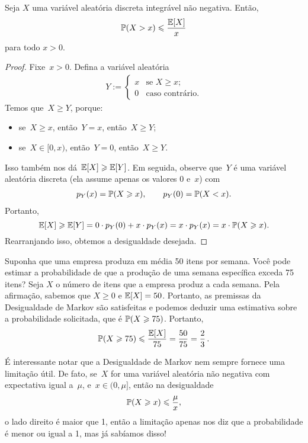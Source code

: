\begin{theorem}
Seja $X$ uma variável aleatória discreta integrável não negativa.
Então,
\[
\mathbb{P}( X > x ) \leqslant \frac{\mathbb{E}[X]}{x}
\]
para todo $x>0$.
\end{theorem}
\begin{proof}
Fixe~$x > 0$. Defina a variável aleatória
\begin{align}
 Y:=\begin{cases} x&\text{se } X \ge x;\\ 0&\text{caso contrário.} \end{cases} 
 \end{align}
Temos que~$X \ge Y$, porque:
\begin{itemize}
\item se~$X \ge x$, então~$Y = x$, então~$X \ge Y$;
\item se~$X \in [0,x)$, então~$Y = 0$, então~$X \ge Y$.
\end{itemize}
Isso também nos dá~$\mathbb{E}[X] \geqslant \mathbb{E}[Y]$. Em seguida, observe que~$Y$ é uma variável aleatória discreta (ela assume apenas os valores 0 e~$x$) com
\begin{align}
 p_Y(x) = \mathbb{P}(X \geqslant x),\qquad p_Y(0) = \mathbb{P}(X < x).
 \end{align}
Portanto,
\[\mathbb{E}[X] \geqslant \mathbb{E}[Y] = 0 \cdot p_Y(0) + x\cdot p_Y(x) = x\cdot p_Y(x) = x\cdot \mathbb{P}(X \geqslant x).\]
Rearranjando isso, obtemos a desigualdade desejada.
\end{proof}

\begin{example}
Suponha que uma empresa produza em média 50 itens por semana. Você pode estimar a probabilidade de que a produção de uma semana específica exceda 75 itens? 
Seja $X$ o número de itens que a empresa produz a cada semana. Pela afirmação, sabemos que $X \geq 0$ e $\mathbb{E}[X]=50$. Portanto, as premissas da Desigualdade de Markov são satisfeitas e podemos deduzir uma estimativa sobre a probabilidade solicitada, que é
$\mathbb{P}(X \geqslant 75)$. 
Portanto,
\begin{equation}
\mathbb{P}(X\geqslant 75) \leqslant \frac{\mathbb{E}[X]}{75} = \frac{50}{75}= \frac{2}{3} \,.
\end{equation}
\end{example}

É interessante notar que a Desigualdade de Markov nem sempre fornece uma limitação útil. De fato, se~$X$ for uma variável aleatória não negativa com expectativa igual a~$\mu$, e~$x \in (0,\mu]$, então na desigualdade
\[\mathbb{P}(X \geqslant x) \leqslant \frac{\mu}{x},\]
o lado direito é maior que 1, então a limitação apenas nos diz que a probabilidade é menor ou igual a 1, mas já sabíamos disso!

